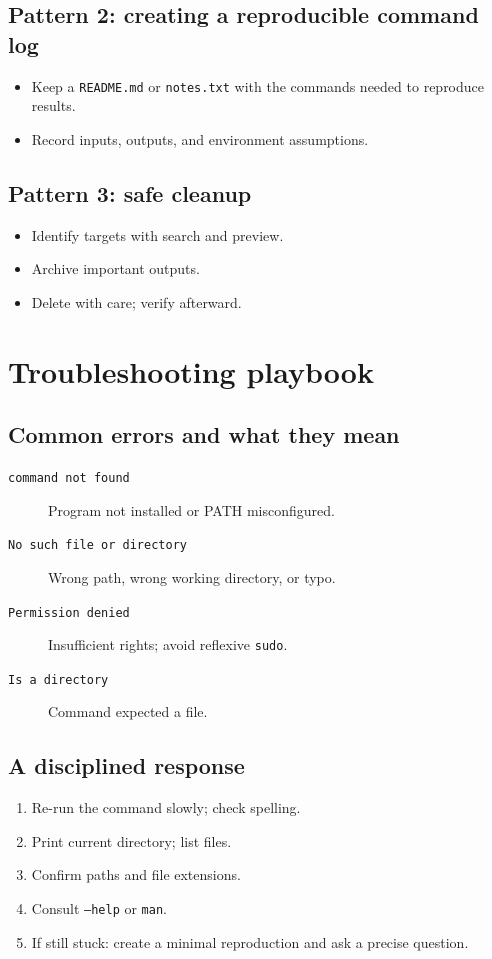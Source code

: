 \subsection{Pattern 2: creating a reproducible command log}
\begin{itemize}
\item Keep a \texttt{README.md} or \texttt{notes.txt} with the commands needed to reproduce results.
\item Record inputs, outputs, and environment assumptions.
\end{itemize}

\subsection{Pattern 3: safe cleanup}
\begin{itemize}
\item Identify targets with search and preview.
\item Archive important outputs.
\item Delete with care; verify afterward.
\end{itemize}

\section{Troubleshooting playbook}
\subsection{Common errors and what they mean}
\begin{description}
\item[\texttt{command not found}] Program not installed or PATH misconfigured.
\item[\texttt{No such file or directory}] Wrong path, wrong working directory, or typo.
\item[\texttt{Permission denied}] Insufficient rights; avoid reflexive \texttt{sudo}.
\item[\texttt{Is a directory}] Command expected a file.
\end{description}

\subsection{A disciplined response}
\begin{enumerate}
\item Re-run the command slowly; check spelling.
\item Print current directory; list files.
\item Confirm paths and file extensions.
\item Consult \texttt{--help} or \texttt{man}.
\item If still stuck: create a minimal reproduction and ask a precise question.
\end{enumerate}

